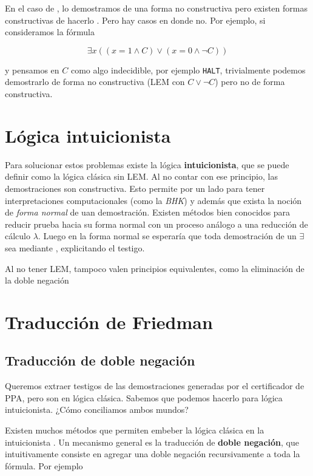 En el caso de , lo demostramos de una forma no constructiva pero
existen formas constructivas de hacerlo . Pero hay casos en donde
no. Por ejemplo, si consideramos la fórmula

\[
    \exists x ((x = 1 \wedge C) \vee (x = 0 \wedge \neg C))
\]

y pensamos en $C$ como algo indecidible, por ejemplo \texttt{HALT}, trivialmente
podemos demostrarlo de forma no constructiva (LEM con $C \vee \neg C$) pero no
de forma constructiva.

\section{Lógica intuicionista}

Para solucionar estos problemas existe la lógica \textbf{intuicionista}, que se
puede definir como la lógica clásica sin LEM. Al no contar con ese principio,
las demostraciones son constructiva. Esto permite por un lado para tener
interpretaciones computacionales (como la \textit{BHK}) y además que exista la
noción de \textit{forma normal} de uan demostración. Existen métodos bien
conocidos para reducir prueba hacia su
forma normal con un proceso análogo a una reducción de cálculo $\lambda$. Luego
en la forma normal se esperaría que toda demostración de un $\exists$ sea
mediante , explicitando el testigo.

Al no tener LEM, tampoco valen principios equivalentes, como la eliminación de
la doble negación 

\section{Traducción de Friedman}

\subsection{Traducción de doble negación}

Queremos extraer testigos de las demostraciones generadas por el certificador de
PPA, pero son en lógica clásica. Sabemos que podemos hacerlo para lógica
intuicionista. ¿Cómo conciliamos ambos mundos?

Existen muchos métodos que permiten embeber la lógica clásica en la
intuicionista . Un mecanismo general es la traducción de
\textbf{doble negación}, que intuitivamente consiste en agregar una doble
negación recursivamente a toda la fórmula. Por ejemplo


